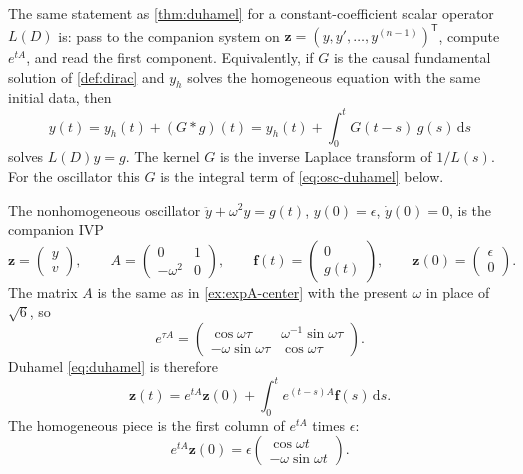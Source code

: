 \documentclass[11pt,a4paper]{article}
\begin{document}
\begin{remark}
\label{rem:scalar-green}
The same statement as \cref{thm:duhamel} for a constant-coefficient scalar operator \(L(D)\) is: pass to the companion system on \(\mathbf{z}=(y,y',\ldots,y^{(n-1)})^{\mathsf T}\), compute \(e^{tA}\), and read the first component. Equivalently, if \(G\) is the causal fundamental solution of \cref{def:dirac} and \(y_{h}\) solves the homogeneous equation with the same initial data, then
\[
y(t)
=
y_{h}(t)+(G*g)(t)
=
y_{h}(t)+\int_{0}^{t} G(t-s)\,g(s)\,\mathrm{d}s
\]
solves \(L(D)y=g\). The kernel \(G\) is the inverse Laplace transform of \(1/L(s)\). For the oscillator this \(G\) is the integral term of \eqref{eq:osc-duhamel} below.
\end{remark}

\begin{example}
\label{ex:green-osc}
The nonhomogeneous oscillator \(\ddot y+\omega^{2} y=g(t)\), \(y(0)=\epsilon\), \(\dot y(0)=0\), is the companion IVP
\[
\mathbf{z}
=
\begin{pmatrix} y \\ v \end{pmatrix},
\qquad
A
=
\begin{pmatrix} 0 & 1 \\ -\omega^{2} & 0 \end{pmatrix},
\qquad
\mathbf{f}(t)
=
\begin{pmatrix} 0 \\ g(t) \end{pmatrix},
\qquad
\mathbf{z}(0)
=
\begin{pmatrix} \epsilon \\ 0 \end{pmatrix}.
\]
The matrix \(A\) is the same as in \cref{ex:expA-center} with the present \(\omega\) in place of \(\sqrt{6}\), so
\[
e^{\tau A}
=
\begin{pmatrix}
\cos\omega\tau & \omega^{-1}\sin\omega\tau \\
-\omega\sin\omega\tau & \cos\omega\tau
\end{pmatrix}.
\]
Duhamel \eqref{eq:duhamel} is therefore
\[
\mathbf{z}(t)
=
e^{tA}\mathbf{z}(0)
+
\int_{0}^{t} e^{(t-s)A}\mathbf{f}(s)\,\mathrm{d}s.
\]
The homogeneous piece is the first column of \(e^{tA}\) times \(\epsilon\):
\[
e^{tA}\mathbf{z}(0)
=
\epsilon
\begin{pmatrix}
\cos\omega t \\
-\omega\sin\omega t
\end{pmatrix}.
\]
\end{example}
\end{document}
